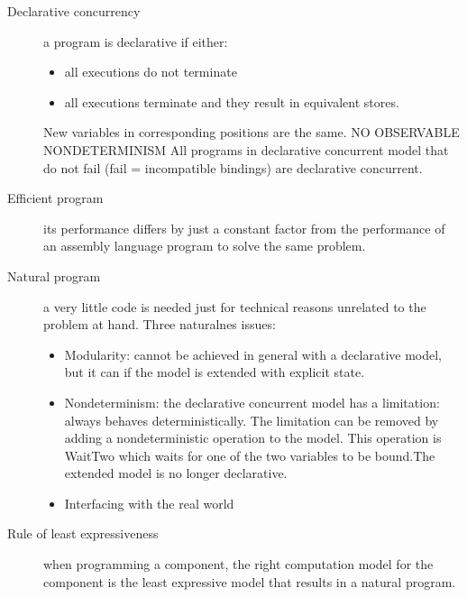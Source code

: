 \begin{description}
  \item[Declarative concurrency] a program is declarative if either:
    \begin{itemize}
      \item all executions do not terminate
      \item all executions terminate and they result in equivalent stores.
    \end{itemize}
    New variables in corresponding positions are the same.
    NO OBSERVABLE NONDETERMINISM
    All programs in declarative concurrent model that do not fail (fail = incompatible bindings) are declarative concurrent.

  \item[Efficient program] its performance differs by just a constant factor from the performance of an assembly language program to solve the same problem.

  \item[Natural program] a very little code is needed just for technical reasons unrelated to the problem at hand.
    Three naturalnes issues:
    \begin{itemize}
      \item Modularity: cannot be achieved in general with a declarative model, but it can if the model is extended with explicit state.
      \item Nondeterminism: the declarative concurrent model has a limitation: always behaves deterministically.
        The limitation can be removed by adding a nondeterministic operation to the model.
        This operation is WaitTwo which waits for one of the two variables to be bound.The extended model is no longer declarative.
      \item Interfacing with the real world
    \end{itemize}

  \item[Rule of least expressiveness] when programming a component, the right computation model for the component is the least expressive model that results in a natural program.



\end{description}
